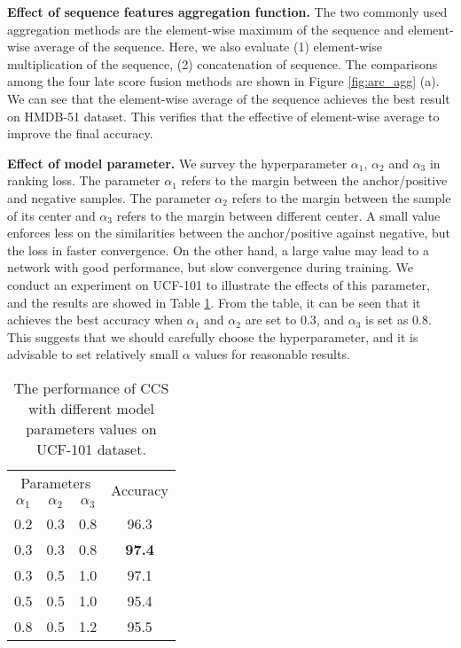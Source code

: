\documentclass[conference,compsoc]{IEEEtran}
\begin{document}
\noindent\textbf{Effect of sequence features aggregation function.} The two commonly used aggregation methods are the element-wise maximum of the sequence and element-wise average of the sequence. Here, we also evaluate (1) element-wise multiplication of the sequence, (2) concatenation of sequence. The comparisons among the four late score fusion methods are shown in Figure \ref{fig:arc_agg} (a). We can see that the element-wise average of the sequence achieves the best result on HMDB-51 dataset. This verifies that the effective of element-wise average to improve the final accuracy.

\noindent\textbf{Effect of model parameter.} We survey the hyperparameter $\alpha_{1}$, $\alpha_{2}$ and $\alpha_{3}$ in ranking loss. The parameter $\alpha_{1}$ refers to the margin between the anchor/positive and negative samples. The parameter $\alpha_{2}$ refers to the margin between the sample of its center and $\alpha_{3}$ refers to the margin between different center. A small value enforces less on the similarities between the anchor/positive against negative, but the loss in faster convergence. On the other hand, a large value may lead to a network with good performance, but slow convergence during training. We conduct an experiment on UCF-101 to illustrate the effects of this parameter, and the results are showed in Table \ref{tab:hyper}. From the table, it can be seen that it achieves the best accuracy when $\alpha_{1}$ and $\alpha_{2}$ are set to $0.3$, and $\alpha_{3}$ is set as $0.8$. This suggests that we should carefully choose the hyperparameter, and it is advisable to set relatively small $\alpha$ values for reasonable results.

\begin{table}
    \caption{The performance of CCS with different model parameters values on UCF-101 dataset.}
   \label{tab:hyper}
\vspace{-3mm}
   \begin{center}
      \begin{tabular}{cccc}
         \toprule
         \multicolumn{3}{c}{Parameters} &
         \multirow{2}{*}{Accuracy} \\
         $\alpha_{1}$ & $\alpha_{2}$ & $\alpha_{3}$ \\
         \midrule
          0.2 & 0.3 & 0.8 & 96.3  \\
          0.3 & 0.3 & 0.8 & \textbf{97.4}  \\
          0.3 & 0.5 & 1.0 & 97.1  \\
          0.5 & 0.5 & 1.0 & 95.4  \\
          0.8 & 0.5 & 1.2 & 95.5   \\
         \bottomrule
      \end{tabular}
   \end{center}
\end{table}
\end{document}
